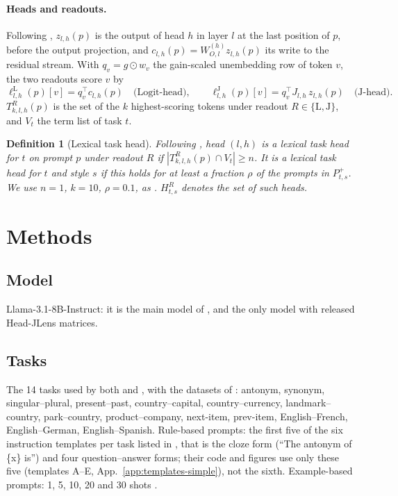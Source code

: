 \documentclass[11pt,a4paper]{article}
\newtheorem{definition}{Definition}
\begin{document}
\paragraph{Heads and readouts.} Following \citet[Sec.~2]{merlo2026headjlens}, $z_{l,h}(p)$ is the output of head $h$ in layer $l$ at the last position of $p$, before the output projection, and $c_{l,h}(p)=W^{(h)}_{O,l}z_{l,h}(p)$ its write to the residual stream. With $q_v=g\odot w_v$ the gain-scaled unembedding row of token $v$, the two readouts score $v$ by
\[
\ell^{\mathrm{L}}_{l,h}(p)[v]=q_v^\top c_{l,h}(p)\quad\text{(Logit-head)},\qquad
\ell^{\mathrm{J}}_{l,h}(p)[v]=q_v^\top J_{l,h}\,z_{l,h}(p)\quad\text{(J-head)}.
\]
$T^{R}_{k,l,h}(p)$ is the set of the $k$ highest-scoring tokens under readout $R\in\{\mathrm{L},\mathrm{J}\}$, and $V_t$ the term list of task $t$.

\begin{definition}[Lexical task head]\label{def:lth}
Following \citet[Sec.~2.2.2]{yang2026shared}, head $(l,h)$ is a lexical task head for $t$ on prompt $p$ under readout $R$ if $|T^{R}_{k,l,h}(p)\cap V_t|\geq n$. It is a lexical task head for $t$ and style $s$ if this holds for at least a fraction $\rho$ of the prompts in $P^{+}_{t,s}$. We use $n=1$, $k=10$, $\rho=0.1$, as \citet{yang2026shared}. $H^{R}_{t,s}$ denotes the set of such heads.
\end{definition}

\section{Methods}\label{sec:methods}

\subsection{Model}\label{sec:model}
Llama-3.1-8B-Instruct: it is the main model of \citet{yang2026shared}, and the only model with released Head-JLens matrices.

\subsection{Tasks}\label{sec:tasks}
The 14 tasks used by both \citet{yang2026shared} and \citet{davidson2025different}, with the datasets of \citet{todd2024function}: antonym, synonym, singular--plural, present--past, country--capital, country--currency, landmark--country, park--country, product--company, next-item, prev-item, English--French, English--German, English--Spanish.
Rule-based prompts: the first five of the six instruction templates per task listed in \citet[App.~A.3.1]{yang2026shared}, that is the cloze form (``The antonym of \{x\} is'') and four question--answer forms; their code and figures use only these five (templates A--E, App.~\ref{app:templates-simple}), not the sixth.
Example-based prompts: 1, 5, 10, 20 and 30 shots \citep[App.~A.3]{yang2026shared}.
\end{document}
